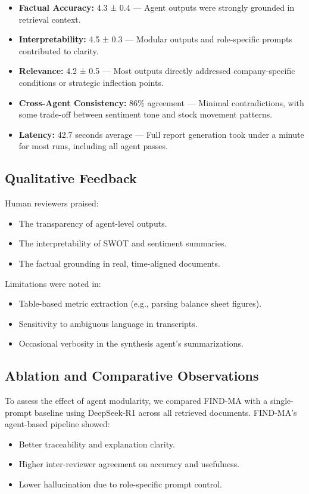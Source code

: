 \documentclass[11pt]{article}
\begin{document}
\begin{itemize}
    \item \textbf{Factual Accuracy:} 4.3 ± 0.4 — Agent outputs were strongly grounded in retrieval context.
    \item \textbf{Interpretability:} 4.5 ± 0.3 — Modular outputs and role-specific prompts contributed to clarity.
    \item \textbf{Relevance:} 4.2 ± 0.5 — Most outputs directly addressed company-specific conditions or strategic inflection points.
    \item \textbf{Cross-Agent Consistency:} 86\% agreement — Minimal contradictions, with some trade-off between sentiment tone and stock movement patterns.
    \item \textbf{Latency:} 42.7 seconds average — Full report generation took under a minute for most runs, including all agent passes.
\end{itemize}

\subsection*{Qualitative Feedback}

Human reviewers praised:
\begin{itemize}
    \item The transparency of agent-level outputs.
    \item The interpretability of SWOT and sentiment summaries.
    \item The factual grounding in real, time-aligned documents.
\end{itemize}

Limitations were noted in:
\begin{itemize}
    \item Table-based metric extraction (e.g., parsing balance sheet figures).
    \item Sensitivity to ambiguous language in transcripts.
    \item Occasional verbosity in the synthesis agent's summarizations.
\end{itemize}

\subsection*{Ablation and Comparative Observations}

To assess the effect of agent modularity, we compared FIND-MA with a single-prompt baseline using DeepSeek-R1 across all retrieved documents. FIND-MA’s agent-based pipeline showed:
\begin{itemize}
    \item Better traceability and explanation clarity.
    \item Higher inter-reviewer agreement on accuracy and usefulness.
    \item Lower hallucination due to role-specific prompt control.
\end{itemize}
\end{document}
